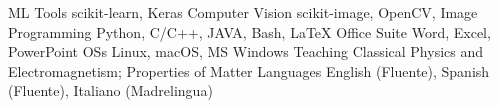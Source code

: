 

\begin{cvskills}
  \cvskill
    {ML Tools}
    {scikit-learn, Keras}
  \cvskill
    {Computer Vision}
    {scikit-image, OpenCV, Image}
  \cvskill
    {Programming} %
    {Python, C/C++, JAVA, Bash, LaTeX} %
  \cvskill
    {Office Suite}
    {Word, Excel, PowerPoint}
  \cvskill
    {OSs}
    {Linux, macOS, MS Windows}
  \cvskill
    {Teaching}
    {Classical Physics and Electromagnetism; Properties of Matter}
  \cvskill
    {Languages} %
    {English (Fluente), Spanish (Fluente), Italiano (Madrelingua)} %
\end{cvskills}
